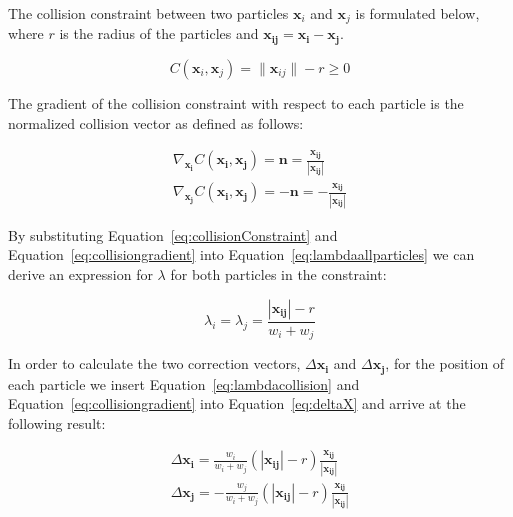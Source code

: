 The collision constraint between two particles $ \mathbf{x}_{i} $ and $
\mathbf{x}_{j} $ is formulated below, where
$ r $ is the radius of the particles and $ \mathbf{x_{ij}} = \mathbf{x_{i}} - \mathbf{x_{j}} $.

\begin{equation} \label{eq:collisionConstraint}
  C(\mathbf{x}_{i}, \mathbf{x}_{j}) = \| \mathbf{x}_{ij} \| - r \geq 0
\end{equation}

The gradient of the collision constraint with respect to each particle is the
normalized collision vector as defined as follows:

\begin{equation}
\label{eq:collisiongradient}
\begin{aligned}
\nabla_{\mathbf{x_{i}}} C(\mathbf{x_{i}}, \mathbf{x_{j}}) = \mathbf{n} = \frac{\mathbf{x_{ij}}}{\left | \mathbf{x_{ij}} \right |}
\\
\nabla_{\mathbf{x_{j}}} C(\mathbf{x_{i}}, \mathbf{x_{j}}) = - \mathbf{n} = - \frac{\mathbf{x_{ij}}}{\left | \mathbf{x_{ij}} \right |}
\end{aligned}
\end{equation}

By substituting Equation~\ref{eq:collisionConstraint} and
Equation~\ref{eq:collisiongradient} into Equation~\ref{eq:lambdaallparticles}
we can derive an expression for $ \lambda $ for both particles in the
constraint:

\begin{equation}
\label{eq:lambdacollision}
\lambda_{i} = \lambda_{j} = \frac{\left | \mathbf{x_{ij}} \right | - r}{w_{i} + w_{j}}
\end{equation}

In order to calculate the two correction vectors, $ \Delta \mathbf{x_{i}} $ and
$ \Delta \mathbf{x_{j}} $, for the position of each particle we insert
Equation~\ref{eq:lambdacollision} and Equation~\ref{eq:collisiongradient} into
Equation~\ref{eq:deltaX} and arrive at the following result:

\begin{equation}
\label{eq:collisionresult}
\begin{aligned}
\Delta \mathbf{x_{i}} = \frac{w_{i}}{w_{i} + w_{j}}(\left | \mathbf{x_{ij}} \right | - r) \frac{\mathbf{x_{ij}}}{\left | \mathbf{x_{ij}} \right |}
\\
\Delta \mathbf{x_{j}} = -\frac{w_{j}}{w_{i} + w_{j}}(\left | \mathbf{x_{ij}} \right | - r) \frac{\mathbf{x_{ij}}}{\left | \mathbf{x_{ij}} \right |}
\end{aligned}
\end{equation}

